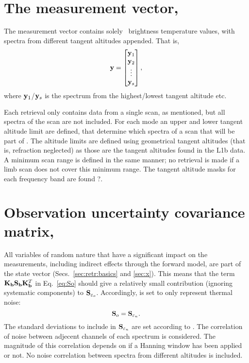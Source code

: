 \section{The measurement vector, \MsrVct}
\label{sec:y}
%
The measurement vector contains solely \smr\ brightness temperature values,
with spectra from different tangent altitudes appended. That is,
\begin{equation}
  \label{eq:y}
  \mathbf{y} =
  \begin{bmatrix}
    \mathbf{y}_1\\ 
    \mathbf{y}_2\\ 
    \vdots\\ 
    \mathbf{y}_s
  \end{bmatrix},
\end{equation}
where $\mathbf{y}_1$/$\mathbf{y}_s$ is the spectrum from the highest/lowest tangent
altitude etc. 

Each retrieval only contains data from a single scan, as mentioned, but all
spectra of the scan are not included. For each mode an upper and lower tangent
altitude limit are defined, that determine which spectra of a scan that will be
part of \MsrVct. The altitude limits are defined using geometrical tangent
altitudes (that is, refraction neglected) as those are the tangent altitudes
found in the L1b data. A minimum scan range is defined in the same manner; no
retrieval is made if a limb scan does not cover this minimum range. The tangent
altitude masks for each frequency band are found ?.



\section{Observation uncertainty covariance matrix, }
\label{sec:So}
%
All variables of random nature that have a significant impact on the
measurements, including indirect effects through the forward model, are part of
the state vector (Secs.~\ref{sec:retr:basics} and \ref{sec:x}). This means that
the term $\mathbf{K}_{\mathbf{b}}\mathbf{S}_{\mathbf{b}} \mathbf{K}_{\mathbf{b}}^T$ in
Eq.~\ref{eq:So} should give a relatively small contribution (ignoring
systematic components) to $\mathbf{S}_{\varepsilon_o}$. Accordingly,  is
set to only represent thermal noise:
\begin{equation}
  \mathbf{S}_{o} = \mathbf{S}_{\varepsilon_n}.
\end{equation}
The standard deviations to include in $\mathbf{S}_{\varepsilon_n}$ are set
according to \citet{atbdl1b}. The correlation of noise between adjecent
channels of each spectrum is considered. The magnitude of this correlation
depends on if a Hanning window has been applied or not. No noise correlation
between spectra from different altitudes is included.



